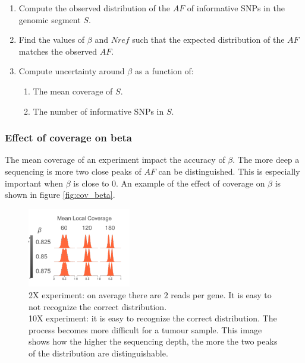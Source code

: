 		\begin{multicols}{2}
			\begin{enumerate}
			\item Compute the observed distribution of the $AF$ of informative SNPs in the genomic segment $S$.
			\item Find the values of $\beta$ and $Nref$ such that the expected distribution of the $AF$ matches the observed $AF$.
			\item Compute uncertainty around $\beta$ as a function of:
				\begin{enumerate}
				\item The mean coverage of $S$.
				\item The number of informative SNPs in $S$.
				\end{enumerate}
			\end{enumerate}
		\end{multicols}


		\subsubsection{Effect of coverage on beta}
		The mean coverage of an experiment impact the accuracy of $\beta$.
		The more deep a sequencing is more two close peaks of $AF$ can be distinguished.
		This is especially important when $\beta$ is close to $0$.
		An example of the effect of coverage on $\beta$ is shown in figure \ref{fig:cov_beta}.

		\begin{figure}[H]
			\centering
			\includegraphics[width=0.4\textwidth]{beta.png}
			\caption{2X experiment: on average there are $2$ reads per gene.
				It is easy to not recognize the correct distribution.\\
				10X experiment: it is easy to recognize the correct distribution.
				The process becomes more difficult for a tumour sample.
				This image shows how the higher the sequencing depth, the more the two peaks of the distribution are distinguishable.}
		\label{fig:beta}
		\end{figure}


